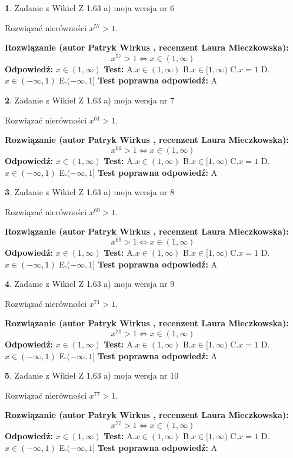 \documentclass[12pt, a4paper]{article}
\theoremstyle{definition} %
\newtheorem{zad}{}
\newcommand{\zadStart}[1]{\begin{zad}#1\newline}
\newcommand{\zadStop}{\end{zad}}
\newcommand{\rozwStart}[2]{\noindent \textbf{Rozwiązanie (autor #1 , recenzent #2): }\newline}
\newcommand{\rozwStop}{\newline}
\newcommand{\odpStart}{\noindent \textbf{Odpowiedź:}\newline}
\newcommand{\odpStop}{\newline}
\newcommand{\testStart}{\noindent \textbf{Test:}\newline}
\newcommand{\testStop}{\newline}
\newcommand{\kluczStart}{\noindent \textbf{Test poprawna odpowiedź:}\newline}
\newcommand{\kluczStop}{\newline}
\begin{document}
\zadStart{Zadanie z Wikieł Z 1.63 a) moja wersja nr 6}

Rozwiązać nierówności $x^{57} > 1$.
\zadStop
\rozwStart{Patryk Wirkus}{Laura Mieczkowska}
$$x^{57} > 1 \iff x \in (1,\infty)$$
\rozwStop
\odpStart
$x \in (1,\infty)$
\odpStop
\testStart
A.$x \in (1,\infty)$ B.$x \in [1,\infty)$ C.$x = 1$ D.$x \in (-\infty,1)$ E.$(-\infty,1]$
\testStop
\kluczStart
A
\kluczStop



\zadStart{Zadanie z Wikieł Z 1.63 a) moja wersja nr 7}

Rozwiązać nierówności $x^{61} > 1$.
\zadStop
\rozwStart{Patryk Wirkus}{Laura Mieczkowska}
$$x^{61} > 1 \iff x \in (1,\infty)$$
\rozwStop
\odpStart
$x \in (1,\infty)$
\odpStop
\testStart
A.$x \in (1,\infty)$ B.$x \in [1,\infty)$ C.$x = 1$ D.$x \in (-\infty,1)$ E.$(-\infty,1]$
\testStop
\kluczStart
A
\kluczStop



\zadStart{Zadanie z Wikieł Z 1.63 a) moja wersja nr 8}

Rozwiązać nierówności $x^{69} > 1$.
\zadStop
\rozwStart{Patryk Wirkus}{Laura Mieczkowska}
$$x^{69} > 1 \iff x \in (1,\infty)$$
\rozwStop
\odpStart
$x \in (1,\infty)$
\odpStop
\testStart
A.$x \in (1,\infty)$ B.$x \in [1,\infty)$ C.$x = 1$ D.$x \in (-\infty,1)$ E.$(-\infty,1]$
\testStop
\kluczStart
A
\kluczStop



\zadStart{Zadanie z Wikieł Z 1.63 a) moja wersja nr 9}

Rozwiązać nierówności $x^{71} > 1$.
\zadStop
\rozwStart{Patryk Wirkus}{Laura Mieczkowska}
$$x^{71} > 1 \iff x \in (1,\infty)$$
\rozwStop
\odpStart
$x \in (1,\infty)$
\odpStop
\testStart
A.$x \in (1,\infty)$ B.$x \in [1,\infty)$ C.$x = 1$ D.$x \in (-\infty,1)$ E.$(-\infty,1]$
\testStop
\kluczStart
A
\kluczStop



\zadStart{Zadanie z Wikieł Z 1.63 a) moja wersja nr 10}

Rozwiązać nierówności $x^{77} > 1$.
\zadStop
\rozwStart{Patryk Wirkus}{Laura Mieczkowska}
$$x^{77} > 1 \iff x \in (1,\infty)$$
\rozwStop
\odpStart
$x \in (1,\infty)$
\odpStop
\testStart
A.$x \in (1,\infty)$ B.$x \in [1,\infty)$ C.$x = 1$ D.$x \in (-\infty,1)$ E.$(-\infty,1]$
\testStop
\kluczStart
A
\kluczStop
\end{document}
